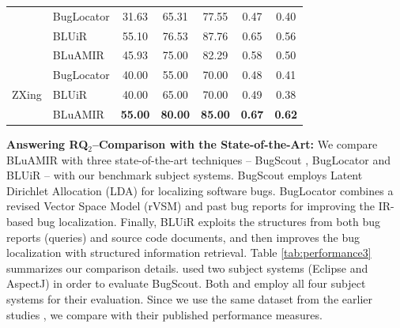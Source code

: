 \documentclass[sigconf,review,anonymous]{acmart}
\begin{document}
\begin{table}[!tb]
{\begin{tabular}{l|l|c|c|c|c|c}
			& BugLocator & 31.63 & 65.31 & 77.55 & 0.47 & 0.40 \\  \cline{2-7} 
			& BLUiR & 55.10 & 76.53 & 87.76 & 0.65  & 0.56 \\  \cline{2-7} &BLuAMIR                                                                     & 45.93                                               & 75.00                                              & 82.29                                             &   0.58  &   0.50  \\ \hline \hline
			\multirow{4}{*}{ZXing}                  
			
			
			& BugLocator & 40.00 & 55.00 & 70.00 & 0.48 & 0.41 \\  \cline{2-7}  
			& BLUiR & 40.00 & 65.00 & 70.00 & 0.49  & 0.38 \\  \cline{2-7}
			&BLuAMIR                                                                  & \textbf{55.00}                                            & \textbf{80.00}                                           & \textbf{85.00}                                             &   \textbf{0.67}  &  \textbf{0.62}   \\ \hline
			
			
			
			
		\end{tabular}
		
	}
	\centering
\end{table}
\textbf{Answering RQ$_2$--Comparison with the State-of-the-Art:}
We compare BLuAMIR with three state-of-the-art techniques -- BugScout \cite{Nguyen}, BugLocator \cite{Jian} and BLUiR \cite{Saha} -- with our benchmark subject systems. 
BugScout employs Latent Dirichlet Allocation (LDA) for localizing software bugs. BugLocator combines a revised Vector Space Model (rVSM) and past bug reports for improving the IR-based bug localization. Finally, BLUiR exploits the structures from both bug reports (queries) and source code documents, and then improves the bug localization with structured information retrieval.    
Table \ref{tab:performance3} summarizes our comparison details.
\citet{Nguyen} used two subject systems (Eclipse and AspectJ) in order to evaluate BugScout.
Both \citet{Saha} and \citet{Jian} employ all four subject systems for their evaluation. Since we use the same dataset from the earlier studies \cite{Saha,Jian}, we compare with their published performance measures. 
\end{document}
